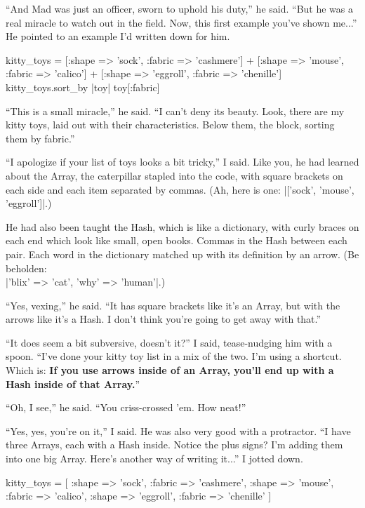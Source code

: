 \documentclass[12pt,twoside]{report}
\begin{document}
``And Mad was just an officer, sworn to uphold his duty,'' he said.
``But he was a real miracle to watch out in the field.  Now, this
first example you've shown me...''  He pointed to an example I'd
written down for him.


\begin{rubycode}

 kitty_toys = 
   [:shape => 'sock', :fabric => 'cashmere'] +
   [:shape => 'mouse', :fabric => 'calico'] +
   [:shape => 'eggroll', :fabric => 'chenille'] 
 kitty_toys.sort_by { |toy| toy[:fabric] }

\end{rubycode}


``This is a small miracle,'' he said. ``I can't deny its beauty.
Look, there are my kitty toys, laid out with their characteristics.
Below them, the block, sorting them by fabric.''

``I apologize if your list of toys looks a bit tricky,'' I said.  Like
you, he had learned about the Array, the caterpillar stapled into the
code, with square brackets on each side and each item separated by
commas.  (Ah, here is one: 
\rubyinline|['sock', 'mouse', 'eggroll']|.) 

He had also been taught the Hash, which is like a dictionary, with
curly braces on each end which look like small, open books.  Commas in
the Hash between each pair.  Each word in the dictionary matched up
with its definition by an arrow.  (Be beholden: \\
\rubyinline|{'blix' => 'cat', 'why' => 'human'}|.)

``Yes, vexing,'' he said.  ``It has square brackets like it's an
Array, but with the arrows like it's a Hash. I don't think you're
going to get away with that.''

``It does seem a bit subversive, doesn't it?''  I said, tease-nudging
him with a spoon.  ``I've done your kitty toy list in a mix of the
two.  I'm using a shortcut.  Which is: {\bf If you use arrows inside
  of an Array, you'll end up with a Hash inside of that Array.}''

``Oh, I see,'' he said.  ``You criss-crossed 'em.  How neat!''

``Yes, yes, you're on it,'' I said.  He was also very good with a
protractor.  ``I have three Arrays, each with a Hash inside.  Notice
the plus signs?  I'm adding them into one big Array.  Here's another
way of writing it...''  I jotted down.


\begin{rubycode}

 kitty_toys = [
   {:shape => 'sock', :fabric => 'cashmere'},
   {:shape => 'mouse', :fabric => 'calico'},
   {:shape => 'eggroll', :fabric => 'chenille'}
 ]

\end{rubycode}
\end{document}
